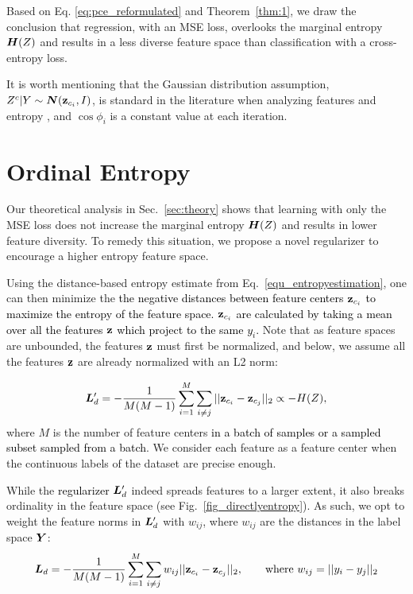 \documentclass{article} %
\def\shihao{\textcolor{black}}
\begin{document}
Based on 
Eq. \ref{eq:pce_reformulated}
and Theorem~\ref{thm:1}, we draw the conclusion that regression, with an MSE loss, overlooks the marginal entropy ${\bm{H}}(Z)$ and results in a less diverse feature space than classification with a cross-entropy loss.




It is worth mentioning that the Gaussian distribution assumption, \ie $Z^c | Y \sim {\bm{N}}({\bf z}_{c_i}, I)$, is standard in the literature when analyzing features \citep{yang2021free,salakhutdinov2012one} and entropy \citep{misra2005estimation}, and $\cos \phi_i$ is a constant value at each iteration.

\section{Ordinal Entropy}

Our theoretical analysis in Sec.~\ref{sec:theory} shows that learning with only the MSE loss does not increase the marginal entropy ${\bm{H}}(Z)$ and results in lower feature diversity.  To remedy this situation, we propose a novel
regularizer to encourage a higher entropy feature space. 

Using the distance-based entropy estimate from Eq.~\ref{equ_entropyestimation}, 
one can then minimize the 
\shihao{the negative distances between feature centers ${\bf z}_{c_i}$ to maximize the entropy of the feature space. ${\bf z}_{c_i}$ are calculated by taking a mean over all the features ${\bf z}$ which project to the same $y_i$.}
Note that as feature spaces are unbounded, the features \shihao{${\bf z}$} must first be normalized, and below, we assume all the features \shihao{${\bf z}$} are already normalized with an L2 norm:



\begin{equation}
    \mL'_d = -\frac{1}{M(M-1)}\sum_{i=1}^M\sum_{i \neq j}||\bz_{c_i} - \bz_{c_j}||_2 \propto \shihao{-} H(Z), 
\end{equation}
where $M$ is the number of feature centers \shihao{in a batch of samples or a sampled subset sampled from a batch}. We consider each feature as a feature center when the continuous labels of the dataset are precise enough.

While the \shihao{regularizer} ${\bm{L}}'_d$ indeed spreads features to a larger extent, it also breaks ordinality in the feature space (see Fig.~\ref{fig_directlyentropy}). As such, we opt to weight the feature norms in ${\bm{L}}'_d$ with $w_{ij}$, where $w_{ij}$ are the distances in the label space ${\bm{Y}}$:
\begin{equation}
    {\bm{L}}_d = -\frac{1}{M(M-1)}\sum_{i=1}^M\sum_{i \neq j}w_{ij}||{\bf z}_{c_i} - {\bf z}_{c_j}||_2, \qquad \text{where } w_{ij} = ||y_i - y_j||_2
    \label{eq:ordinal_entropy}
\end{equation}
\end{document}

